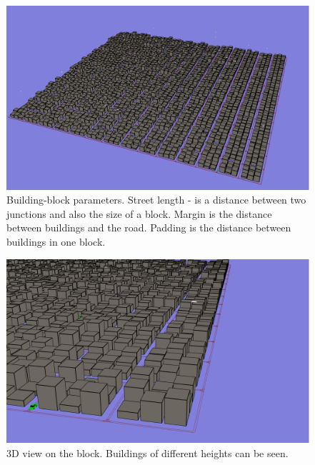 \documentclass[]{nsm-thesis}
\begin{document}
\begin{figure}
	\centering
	\includegraphics[width=1\textwidth]{figures/GlobalView3D.png}
	\caption{Building-block parameters. Street length - is a distance between two junctions and also the size of a block. Margin is the distance between buildings and the road. Padding is the distance between buildings in one block.}
	\label{fig:manhattangrid3d}
\end{figure}

\begin{figure}
	\centering
	\includegraphics[width=1\textwidth]{figures/GlobalView3D-Block.png}
	\caption{3D view on the block. Buildings of different heights can be seen.}
	\label{fig:manhattangrid3dblock}
\end{figure}
\end{document}
